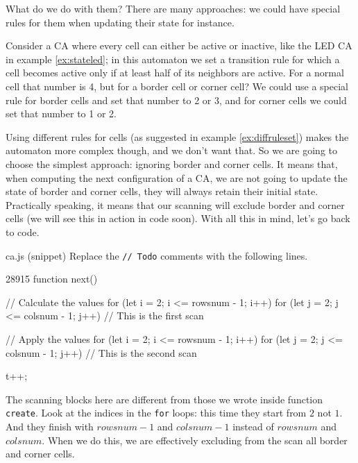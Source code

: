 What do we do with them? There are many approaches: we could have special rules for them when updating their
state for instance.

\begin{example}
\label{ex:diffruleset}
Consider a CA where every cell can either be active or inactive, like the LED CA in
example \ref{ex:stateled}; in this automaton we set a transition rule for which 
a cell becomes active only if at least half of its neighbors are active. For a
normal cell that number is 4, but for a border cell or corner cell? We could use a special rule for border
cells and set that number to 2 or 3, and for corner cells we could set that number to 1 or 2.
\end{example}

Using different rules for cells (as suggested in example \ref{ex:diffruleset})
makes the automaton more complex though, and we don't want that.
So we are going to
choose the simplest approach: ignoring border and corner cells. It means that, when computing the next
configuration of a CA, we are not going to update the state of border and corner cells, they will always retain their initial state. Practically speaking, it means that our scanning will exclude border and corner cells
(we will see this in action in code soon). With all this in mind, let's go back to code.

\begin{programcode}{ca.js (snippet)}
Replace the \texttt{// Todo} comments with the following lines.
\begin{codeh2}{2}{8}{9}{15}
function next() {
  // Calculate the values
  for (let i = 2; i <= rowsnum - 1; i++) {
    for (let j = 2; j <= colsnum - 1; j++) {
      // This is the first scan
    }
  }

  // Apply the values
  for (let i = 2; i <= rowsnum - 1; i++) {
    for (let j = 2; j <= colsnum - 1; j++) {
      // This is the second scan
    }
  }

  t++;
}
\end{codeh2}
\end{programcode}

The scanning blocks here are different from those we wrote inside function \texttt{create}.
Look at the indices in the \texttt{for} loops: this time they start from
$2$ not $1$. And they finish with $rowsnum - 1$ and $colsnum - 1$ instead of $rowsnum$ and $colsnum$.
When we do this, we are effectively excluding from the scan all border and corner cells.

